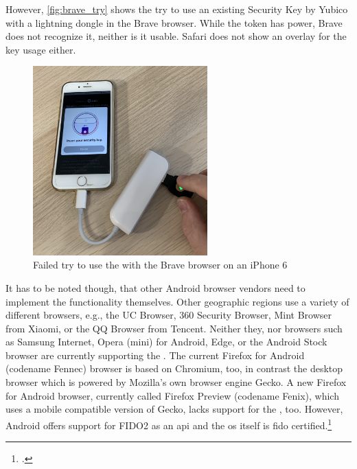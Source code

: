 However, \autoref{fig:brave_try} shows the try to use an existing Security Key by Yubico with a lightning dongle in the Brave browser. While the token has power, Brave does not recognize it, neither is it usable. Safari does not show an overlay for the key usage either.

\begin{figure}[hbt]
	\centering
	\includegraphics[width=0.6\textwidth]{pics/brave_try_dongle.eps}
	\caption[Failed try to use the \wa{} with the Brave browser on an iPhone 6]{Failed try to use the \wa{} with the Brave browser on an iPhone 6\footnotemark}
	\label{fig:brave_try}
\end{figure}

\newpage

It has to be noted though, that other Android browser vendors need to implement the functionality themselves. Other geographic regions use a variety of different browsers, e.g., the UC Browser, 360 Security Browser, Mint Browser from Xiaomi, or the QQ Browser from Tencent. Neither they, nor browsers such as Samsung Internet, Opera (mini) for Android, Edge, or the Android Stock browser are currently supporting the \wa. The current Firefox for Android (codename \frqq Fennec\flqq) browser is based on Chromium, too, in contrast the desktop browser which is powered by Mozilla's own browser engine Gecko. A new Firefox for Android browser, currently called Firefox Preview (codename \frqq Fenix\flqq), which uses a mobile compatible version of Gecko, lacks support for the \wa, too. However, Android offers support for FIDO2 as an \gls{api} and the \gls{os} itself is \gls{fido} certified.\footcites[See][24]{fido-ct-3}

